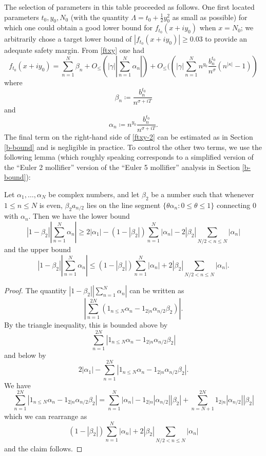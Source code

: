 The selection of parameters in this table proceeded as follows.  One first located parameters $t_0, y_0, N_0$ (with the quantity $\Lambda = t_0 + \frac{1}{2} y_0^2$ as small as possible) for which one could obtain a good lower bound for $f_{t_0}(x+iy_0)$ when $x=N_0$; we arbitrarily chose a target lower bound of $|f_{t_0}(x+iy_0)| \geq 0.03$ to provide an adequate safety margin.  From \eqref{ftxy} one had
\begin{equation}\label{ftxy-2}
 f_{t_0}(x+iy_0) = \sum_{n=1}^N \beta_n + O_{\leq}( |\gamma| |\sum_{n=1}^N \alpha_n| ) + O_{\leq}(\left( |\gamma| \sum_{n=1}^N n^{y_0} \frac{b_n^{t_0}}{n^\sigma} (n^{|\kappa|}-1) \right)
\end{equation}
where
$$ \beta_n \coloneqq \frac{b_n^{t_0}}{n^{\sigma+iT}}$$
and
$$ \alpha_n \coloneqq n^{y_0} \frac{b_n^{t_0}}{n^{\sigma+iT}}.$$
The final term on the right-hand side of \eqref{ftxy-2} can be estimated as in Section \ref{b-bound} and is negligible in practice.  To control the other two terms, we use the following lemma (which roughly speaking corresponds to a simplified version of the ``Euler 2 mollifier'' version of the ``Euler 5 mollifier'' analysis in Section \ref{b-bound}):

\begin{lemma}\label{trib2}  Let $\alpha_1,\dots,\alpha_N$ be complex numbers, and let $\beta_2$ be a number such that whenever $1 \leq n \leq N$ is even, $\beta_2 a_{n/2}$ lies on the line segment $\{ \theta \alpha_n: 0 \leq \theta \leq 1\}$ connecting 0 with $\alpha_n$.  Then we have the lower bound
$$ |1-\beta_2| \left|\sum_{n=1}^N \alpha_n\right| \geq 2 |\alpha_1| - (1-|\beta_2|) \sum_{n=1}^N |\alpha_n| - 2 |\beta_2| \sum_{N/2 < n \leq N} |\alpha_n|$$
and the upper bound
$$ |1-\beta_2| \left|\sum_{n=1}^N \alpha_n\right| \leq (1-|\beta_2|) \sum_{n=1}^N |\alpha_n| + 2 |\beta_2| \sum_{N/2 < n \leq N} |\alpha_n|.$$
\end{lemma}

\begin{proof} The quantity $|1-\beta_2| |\sum_{n=1}^N \alpha_n|$ can be written as
$$ \left|\sum_{n=1}^{2N} (1_{n \leq N} \alpha_n - 1_{2|n} \alpha_{n/2} \beta_2)\right|.$$
By the triangle inequality, this is bounded above by
$$ \sum_{n=1}^{2N} |1_{n \leq N} \alpha_n - 1_{2|n} \alpha_{n/2} \beta_2|$$
and below by
$$ 2 |\alpha_1| - \sum_{n=1}^{2N} |1_{n \leq N} \alpha_n - 1_{2|n} \alpha_{n/2} \beta_2|.$$
We have
$$ \sum_{n=1}^{2N} |1_{n \leq N} \alpha_n - 1_{2|n} \alpha_{n/2} \beta_2| = \sum_{n=1}^N |\alpha_n| - 1_{2|n} |\alpha_{n/2}| |\beta_2| + \sum_{n=N+1}^{2N} 1_{2|n} |\alpha_{n/2}| |\beta_2|$$
which we can rearrange as
$$ (1 - |\beta_2|) \sum_{n=1}^N |\alpha_n| + 2 |\beta_2| \sum_{N/2 < n \leq N} |\alpha_n|$$
and the claim follows.
\end{proof}

